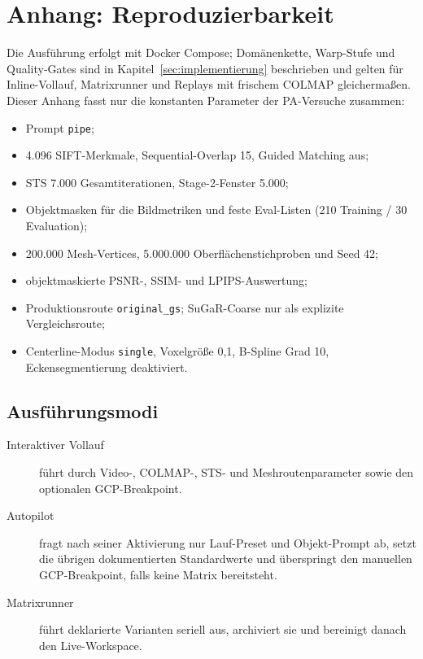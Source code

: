 \section{Anhang: Reproduzierbarkeit}

Die Ausführung erfolgt mit Docker Compose; Domänenkette, Warp-Stufe und
Quality-Gates sind in Kapitel~\ref{sec:implementierung} beschrieben und gelten
für Inline-Vollauf, Matrixrunner und Replays mit frischem COLMAP gleichermaßen.
Dieser Anhang fasst nur die konstanten Parameter der PA-Versuche zusammen:

\begin{itemize}
  \item Prompt \texttt{pipe};
  \item 4.096 SIFT-Merkmale, Sequential-Overlap 15, Guided Matching aus;
  \item STS 7.000 Gesamtiterationen, Stage-2-Fenster 5.000;
  \item Objektmasken für die Bildmetriken und feste Eval-Listen
        (210 Training / 30 Evaluation);
  \item 200.000 Mesh-Vertices, 5.000.000 Oberflächenstichproben und Seed 42;
  \item objektmaskierte PSNR-, SSIM- und LPIPS-Auswertung;
  \item Produktionsroute \texttt{original\_gs}; SuGaR-Coarse nur als
        explizite Vergleichsroute;
  \item Centerline-Modus \texttt{single}, Voxelgröße 0,1, B-Spline Grad 10,
        Eckensegmentierung deaktiviert.
\end{itemize}

\subsection*{Ausführungsmodi}

\begin{description}
  \item[Interaktiver Vollauf] führt durch Video-, COLMAP-, STS- und
    Meshroutenparameter sowie den optionalen GCP-Breakpoint.
  \item[Autopilot] fragt nach seiner Aktivierung nur Lauf-Preset und
    Objekt-Prompt ab, setzt die übrigen dokumentierten Standardwerte und
    überspringt den manuellen GCP-Breakpoint, falls keine Matrix bereitsteht.
  \item[Matrixrunner] führt deklarierte Varianten seriell aus, archiviert sie
    und bereinigt danach den Live-Workspace.
\end{description}


